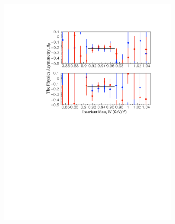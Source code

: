 \documentclass[12pt]{article}
\begin{document}
\begin{figure}[htbp]
\centering
        \begin{subfigure}[htbp]{0.49\textwidth}
               \centering
               \includegraphics[width=\textwidth]{apsingle}
                \label{apsingled}
      \end{subfigure}
          \begin{subfigure}[htbp]{0.5\textwidth}
                \centering

\end{subfigure}
\end{figure}
\end{document}
